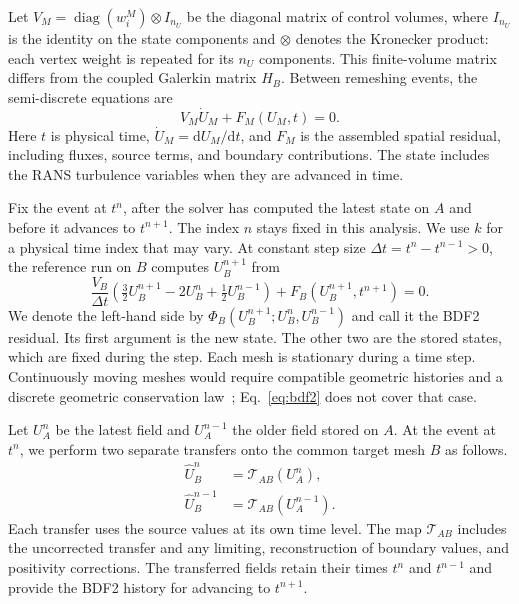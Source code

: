 \documentclass[a4paper,fleqn]{cas-sc}
\begin{document}
Let $V_M=\operatorname{diag}(w_i^M)\otimes I_{n_U}$ be the diagonal matrix of control volumes, where $I_{n_U}$ is the identity on the state components and $\otimes$ denotes the Kronecker product: each vertex weight is repeated for its $n_U$ components. This finite-volume matrix differs from the coupled Galerkin matrix $H_B$. Between remeshing events, the semi-discrete equations are
\begin{equation}
 V_M\dot U_M+F_M(U_M,t)=0.
 \label{eq:semidiscrete}
\end{equation}
Here $t$ is physical time, $\dot U_M=\mathrm dU_M/\mathrm dt$, and $F_M$ is the assembled spatial residual, including fluxes, source terms, and boundary contributions. The state includes the RANS turbulence variables when they are advanced in time.

Fix the event at $t^n$, after the solver has computed the latest state on $A$ and before it advances to $t^{n+1}$. The index $n$ stays fixed in this analysis. We use $k$ for a physical time index that may vary. At constant step size $\Delta t=t^n-t^{n-1}>0$, the reference run on $B$ computes $U_B^{n+1}$ from
\begin{equation}
 \frac{V_B}{\Delta t}\left(\tfrac32U_B^{n+1}-2U_B^n+\tfrac12U_B^{n-1}\right)
   +F_B(U_B^{n+1},t^{n+1})=0.
 \label{eq:bdf2}
\end{equation}
We denote the left-hand side by $\Phi_B(U_B^{n+1};U_B^n,U_B^{n-1})$ and call it the BDF2 residual. Its first argument is the new state. The other two are the stored states, which are fixed during the step. Each mesh is stationary during a time step. Continuously moving meshes would require compatible geometric histories and a discrete geometric conservation law~\cite{KoobusFarhat1999,GeuzaineGrandmontFarhat2003}; Eq.~\eqref{eq:bdf2} does not cover that case.

Let $U_A^n$ be the latest field and $U_A^{n-1}$ the older field stored on $A$. At the event at $t^n$, we perform two separate transfers onto the common target mesh $B$ as follows.
\[
 \begin{aligned}
 \widehat U_B^n &= \mathcal T_{AB}(U_A^n),\\
 \widehat U_B^{n-1} &= \mathcal T_{AB}(U_A^{n-1}).
 \end{aligned}
\]
Each transfer uses the source values at its own time level. The map $\mathcal T_{AB}$ includes the uncorrected transfer and any limiting, reconstruction of boundary values, and positivity corrections. The transferred fields retain their times $t^n$ and $t^{n-1}$ and provide the BDF2 history for advancing to $t^{n+1}$.
\end{document}
